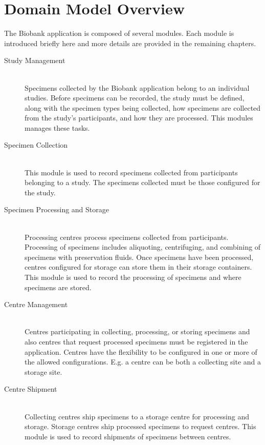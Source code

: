 \chapter{Domain Model Overview}

The Biobank application is composed of several modules. Each module is
introduced briefly here and more details are provided in the remaining
chapters.

\begin{description}

  \item[Study Management] \hfill \\ Specimens collected by the Biobank
    application belong to an individual studies. Before specimens can be
    recorded, the study must be defined, along with the specimen types being
    collected, how specimens are collected from the study's participants, and
    how they are processed. This modules manages these tasks.

  \item[Specimen Collection] \hfill \\ This module is used to record
    specimens collected from participants belonging to a study. The specimens
    collected must be those configured for the study.

  \item[Specimen Processing and Storage] \hfill \\ Processing centres process
    specimens collected from participants. Processing of specimens includes
    aliquoting, centrifuging, and combining of specimens with preservation
    fluids.  Once specimens have been processed, centres configured for storage
    can store them in their storage containers. This module is used to record
    the processing of specimens and where specimens are stored.

  \item[Centre Management] \hfill \\ Centres participating in collecting,
    processing, or storing specimens and also centres that request processed
    specimens must be registered in the application. Centres have the
    flexibility to be configured in one or more of the allowed
    configurations. E.g. a centre can be both a collecting site and a storage
    site.

  \item[Centre Shipment] \hfill \\ Collecting centres ship specimens to a
    storage centre for processing and storage. Storage centres ship processed
    specimens to request centres. This module is used to record shipments of
    specimens between centres.


\end{description}
